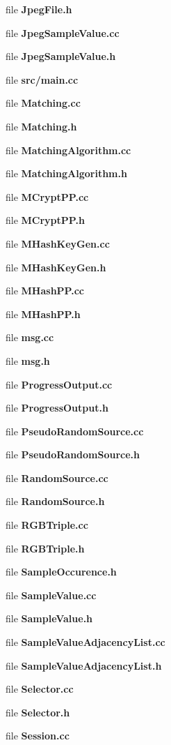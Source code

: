 \begin{DoxyCompactItemize}
\item 
file \textbf{ Jpeg\+File.\+h}
\item 
file \textbf{ Jpeg\+Sample\+Value.\+cc}
\item 
file \textbf{ Jpeg\+Sample\+Value.\+h}
\item 
file \textbf{ src/main.\+cc}
\item 
file \textbf{ Matching.\+cc}
\item 
file \textbf{ Matching.\+h}
\item 
file \textbf{ Matching\+Algorithm.\+cc}
\item 
file \textbf{ Matching\+Algorithm.\+h}
\item 
file \textbf{ M\+Crypt\+P\+P.\+cc}
\item 
file \textbf{ M\+Crypt\+P\+P.\+h}
\item 
file \textbf{ M\+Hash\+Key\+Gen.\+cc}
\item 
file \textbf{ M\+Hash\+Key\+Gen.\+h}
\item 
file \textbf{ M\+Hash\+P\+P.\+cc}
\item 
file \textbf{ M\+Hash\+P\+P.\+h}
\item 
file \textbf{ msg.\+cc}
\item 
file \textbf{ msg.\+h}
\item 
file \textbf{ Progress\+Output.\+cc}
\item 
file \textbf{ Progress\+Output.\+h}
\item 
file \textbf{ Pseudo\+Random\+Source.\+cc}
\item 
file \textbf{ Pseudo\+Random\+Source.\+h}
\item 
file \textbf{ Random\+Source.\+cc}
\item 
file \textbf{ Random\+Source.\+h}
\item 
file \textbf{ R\+G\+B\+Triple.\+cc}
\item 
file \textbf{ R\+G\+B\+Triple.\+h}
\item 
file \textbf{ Sample\+Occurence.\+h}
\item 
file \textbf{ Sample\+Value.\+cc}
\item 
file \textbf{ Sample\+Value.\+h}
\item 
file \textbf{ Sample\+Value\+Adjacency\+List.\+cc}
\item 
file \textbf{ Sample\+Value\+Adjacency\+List.\+h}
\item 
file \textbf{ Selector.\+cc}
\item 
file \textbf{ Selector.\+h}
\item 
file \textbf{ Session.\+cc}

\end{DoxyCompactItemize}
